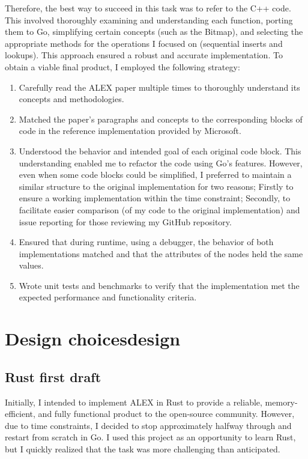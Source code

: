 Therefore, the best way to succeed in this task was to refer to the C++ code. This involved thoroughly examining and understanding each function, porting them to Go, simplifying certain concepts (such as the Bitmap), and selecting the appropriate methods for the operations I focused on (sequential inserts and lookups). This approach ensured a robust and accurate implementation.
To obtain a viable final product, I employed the following strategy:

\begin{enumerate}
    \item Carefully read the ALEX paper multiple times to thoroughly understand its concepts and methodologies.
    \item Matched the paper's paragraphs and concepts to the corresponding blocks of code in the reference implementation provided by Microsoft.
    \item Understood the behavior and intended goal of each original code block. This understanding enabled me to refactor the code using Go's features. However, even when some code blocks could be simplified, I preferred to maintain a similar structure to the original implementation for two reasons; Firstly to ensure a working implementation within the time constraint; Secondly, to facilitate easier comparison (of my code to the original implementation) and issue reporting for those reviewing my GitHub repository.
    \item Ensured that during runtime, using a debugger, the behavior of both implementations matched and that the attributes of the nodes held the same values.
    \item Wrote unit tests and benchmarks to verify that the implementation met the expected performance and functionality criteria.
\end{enumerate}

\let\clearpage\relax
\chapter{Design choicesdesign}
\section{Rust first draft}
Initially, I intended to implement ALEX in Rust to provide a reliable, memory-efficient, and fully functional product to the open-source community. However, due to time constraints, I decided to stop approximately halfway through and restart from scratch in Go. I used this project as an opportunity to learn Rust, but I quickly realized that the task was more challenging than anticipated.

